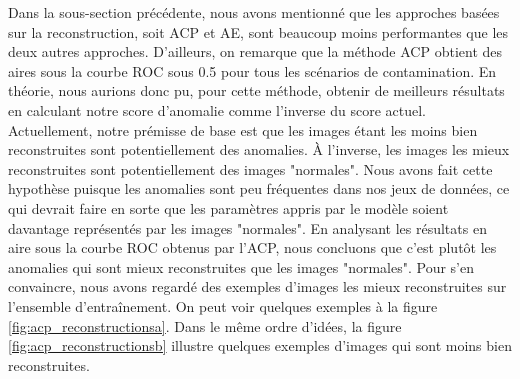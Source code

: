 Dans la sous-section précédente, nous avons mentionné que les approches basées sur la reconstruction, soit ACP et AE, sont beaucoup moins performantes que les deux autres approches. D'ailleurs, on remarque que la méthode ACP obtient des aires sous la courbe ROC sous 0.5 pour tous les scénarios de contamination. En théorie, nous aurions donc pu, pour cette méthode, obtenir de meilleurs résultats en calculant notre score d'anomalie comme l'inverse du score actuel. Actuellement, notre prémisse de base est que les images étant les moins bien reconstruites sont potentiellement des anomalies. À l'inverse, les images les mieux reconstruites sont potentiellement des images "normales". Nous avons fait cette hypothèse puisque les anomalies sont peu fréquentes dans nos jeux de données, ce qui devrait faire en sorte que les paramètres appris par le modèle soient davantage représentés par les images "normales". En analysant les résultats en aire sous la courbe ROC obtenus par l'ACP, nous concluons que c'est plutôt les anomalies qui sont mieux reconstruites que les images "normales". Pour s'en convaincre, nous avons regardé des exemples d'images les mieux reconstruites sur l'ensemble d'entraînement. On peut voir quelques exemples à la figure \ref{fig:acp_reconstructionsa}. Dans le même ordre d'idées, la figure \ref{fig:acp_reconstructionsb} illustre quelques exemples d'images qui sont moins bien reconstruites. 

